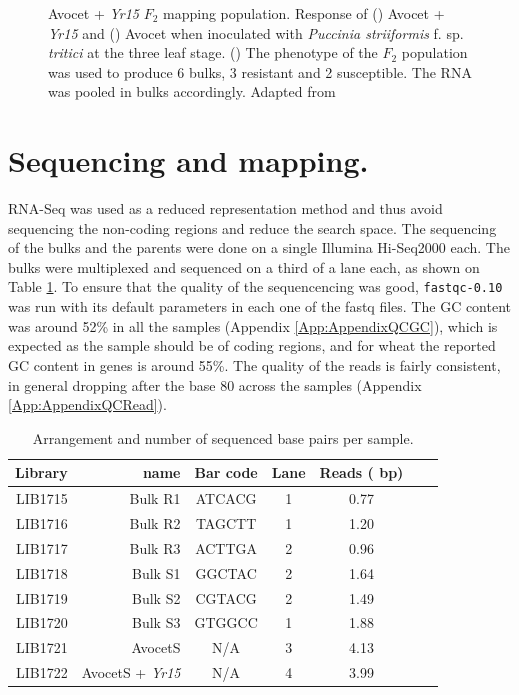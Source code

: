 \begin{figure}
    \caption[Avocet + \textit{Yr15} $F_{2}$  mapping population.]{Avocet + \textit{Yr15} $F_{2}$  mapping population. Response of () Avocet + \textit{Yr15} and () Avocet when inoculated with \textit{Puccinia striiformis} f. sp.  \textit{tritici} at the three leaf stage. () The phenotype of the $F_{2}$ population was used to produce 6 bulks, 3 resistant and 2 susceptible. The RNA was pooled in bulks accordingly. Adapted from \citep{Ramirez-Gonzalez2015b}}

\end{figure}


\section{Sequencing and mapping.} 

RNA-Seq was used as a reduced representation method and thus avoid sequencing the non-coding regions and reduce the search space.  
The sequencing of the bulks and the parents were done on a single Illumina Hi-Seq2000 each.
The bulks were multiplexed and sequenced on a third of a lane each, as shown on Table \ref{tab:yr15:reads}. 
To ensure that the quality of the sequencencing was good, \verb|fastqc-0.10| \citep{fastqc}  was run with its default parameters in each one of the fastq files.  
The GC content was around 52\% in all the samples (Appendix \ref{App:AppendixQCGC}), which is expected as the sample should be of coding regions, and for wheat the reported GC content in genes is around 55\%.  
The quality of the reads is fairly consistent, in general dropping after the base 80 across the samples (Appendix \ref{App:AppendixQCRead}). 
\label{yr15:sequencing}

\begin{table}
\centering
\caption{Arrangement and number of sequenced base pairs per sample. }
\label{tab:yr15:reads}
\begin{tabular}{rrccccc}
\toprule
Library & name & Bar code & Lane   &  Reads (\e{8} bp)\\ 
\midrule
LIB1715 & Bulk R1 & ATCACG & 1  & 0.77\\
LIB1716 & Bulk R2 & TAGCTT & 1    & 1.20\\
LIB1717 & Bulk R3 & ACTTGA & 2  & 0.96  \\ 
LIB1718 & Bulk S1 & GGCTAC & 2  & 1.64   \\ 
LIB1719 & Bulk S2 & CGTACG & 2  & 1.49  \\ 
LIB1720 & Bulk S3 & GTGGCC & 1  &1.88  \\ 
LIB1721 & AvocetS & N/A & 3     & 4.13 \\ 
LIB1722 & AvocetS + \textit{Yr15} & N/A & 4   & 3.99  \\ 
\bottomrule
\end{tabular}
\end{table}



